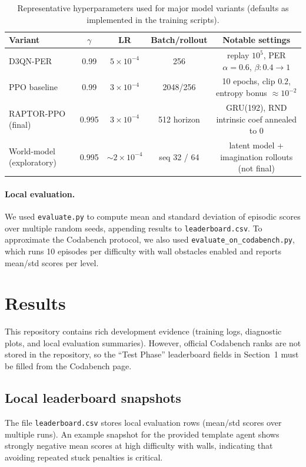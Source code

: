 \documentclass[11pt, oneside]{article}    %
\begin{document}
\begin{table}[H]
\centering
\caption{Representative hyperparameters used for major model variants (defaults as implemented in the training scripts).}
\label{tab:hparams}
\begin{tabular}{lcccc}
\toprule
Variant & $\gamma$ & LR & Batch/rollout & Notable settings \\
\midrule
D3QN-PER \citep{schaul2016per,wang2016dueling,vanhasselt2016double} & 0.99 & $5\times10^{-4}$ & 256 & replay $10^5$, PER $\alpha=0.6$, $\beta:0.4\rightarrow1$ \\
PPO baseline \citep{schulman2017ppo} & 0.99 & $3\times10^{-4}$ & 2048/256 & 10 epochs, clip $0.2$, entropy bonus $\approx 10^{-2}$ \\
RAPTOR-PPO (final) & 0.995 & $3\times10^{-4}$ & 512 horizon & GRU(192), RND intrinsic coef annealed to 0 \\
World-model (exploratory) \citep{hafner2020dreamer} & 0.995 & $\sim 2\times10^{-4}$ & seq 32 / 64 & latent model + imagination rollouts (not final) \\
\bottomrule
\end{tabular}
\end{table}

\paragraph{Local evaluation.}
We used \texttt{evaluate.py} to compute mean and standard deviation of episodic scores over multiple random seeds, appending results to \texttt{leaderboard.csv}. To approximate the Codabench protocol, we also used \texttt{evaluate\_on\_codabench.py}, which runs 10 episodes per difficulty with wall obstacles enabled and reports mean/std scores per level.

\section{Results}
This repository contains rich development evidence (training logs, diagnostic plots, and local evaluation summaries). However, official Codabench ranks are not stored in the repository, so the ``Test Phase'' leaderboard fields in Section~1 must be filled from the Codabench page.

\subsection{Local leaderboard snapshots}
The file \texttt{leaderboard.csv} stores local evaluation rows (mean/std scores over multiple runs). An example snapshot for the provided template agent shows strongly negative mean scores at high difficulty with walls, indicating that avoiding repeated stuck penalties is critical.
\end{document}
